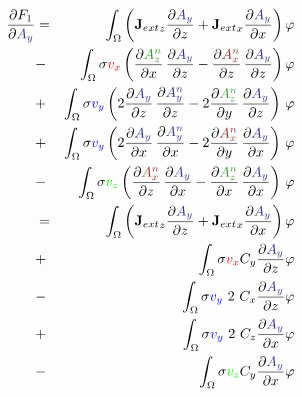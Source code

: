 \documentclass[smallextended]{svjour3}       %
\begin{document}
			\begin{eqnarray}
			\frac{\partial F_1}{\partial \textcolor{darkblu}{A_y}} & = &
			\int_{\Omega} \left({\mathbf{J}_{ext}}_z \frac{\partial \textcolor{darkblu}{A_y}}{\partial z} + {\mathbf{J}_{ext}}_x \frac{\partial \textcolor{darkblu}{A_y}}{\partial x}\right) \varphi		
			\nonumber \\
			& - &\int_{\Omega} \sigma \textcolor{red}{v_x} \left(
				\frac{\partial \textcolor{darkgre}{A_z^n}}{\partial x}\,\frac{\partial \textcolor{darkblu}{A_y}}{\partial z}
				- \frac{\partial \textcolor{darkred}{A_x^n}}{\partial z}\,\frac{\partial \textcolor{darkblu}{A_y}}{\partial z}
				\right) \varphi \nonumber \\			
			& + & \int_{\Omega} \sigma \textcolor{blu}{v_y} \left( 2 \frac{\partial \textcolor{darkblu}{A_y}}{\partial z}\,\frac{\partial \textcolor{darkblu}{A_y^n}}{\partial z} - 2 \frac{\partial \textcolor{darkgre}{A_z^n}}{\partial y}\,\frac{\partial \textcolor{darkblu}{A_y}}{\partial z} \right)\, \varphi \nonumber \\		
			& + & \int_{\Omega} \sigma \textcolor{blu}{v_y} \left( 2 \frac{\partial \textcolor{darkblu}{A_y}}{\partial x}\,\frac{\partial \textcolor{darkblu}{A_y^n}}{\partial x} - 2 \frac{\partial \textcolor{darkred}{A_x^n}}{\partial y}\,\frac{\partial \textcolor{darkblu}{A_y}}{\partial x} \right)\, \varphi \nonumber \\		
			& - & \int_{\Omega} \sigma \textcolor{gre}{v_z} \left(\frac{\partial \textcolor{darkred}{A_x^n}}{\partial z}\,\frac{\partial \textcolor{darkblu}{A_y}}{\partial x} - \frac{\partial \textcolor{darkgre}{A_z^n}}{\partial x}\,\frac{\partial \textcolor{darkblu}{A_y}}{\partial x} \right)\, \varphi\\
						 & = &
			\int_{\Omega} \left({\mathbf{J}_{ext}}_z \frac{\partial \textcolor{darkblu}{A_y}}{\partial z} + {\mathbf{J}_{ext}}_x \frac{\partial \textcolor{darkblu}{A_y}}{\partial x}\right) \varphi		
			\nonumber \\
			& + &\int_{\Omega} \sigma  \textcolor{red}{v_x}    C_y \frac{\partial \textcolor{darkblu}{A_y}}{\partial z} \varphi \nonumber \\			
			& - & \int_{\Omega} \sigma \textcolor{blu}{v_y}\ 2\ C_x \frac{\partial \textcolor{darkblu}{A_y}}{\partial z} \varphi \nonumber \\			
			& + & \int_{\Omega} \sigma \textcolor{blu}{v_y}\ 2\ C_z \frac{\partial \textcolor{darkblu}{A_y}}{\partial x} \varphi \nonumber \\			
			& - & \int_{\Omega} \sigma \textcolor{gre}{v_z}    C_y \frac{\partial \textcolor{darkblu}{A_y}}{\partial x} \varphi
					\end{eqnarray}
					
\end{document}
